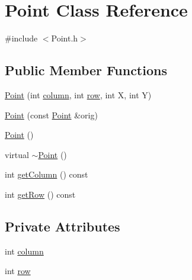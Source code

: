 \hypertarget{classPoint}{
\section{Point Class Reference}
\label{classPoint}
}


{\ttfamily \#include $<$Point.h$>$}\subsection*{Public Member Functions}
\begin{DoxyCompactItemize}
\item 
\hyperlink{classPoint_acd78354f6acd6d1c1bd18c848022ebbc}{Point} (int \hyperlink{classPoint_a08041071ec0b92b604e5f56c0ed47e44}{column}, int \hyperlink{classPoint_a23c0e7e187fad47e1524872d44841908}{row}, int X, int Y)
\item 
\hyperlink{classPoint_a2b6961ba767c68075667c0f3064c6ba9}{Point} (const \hyperlink{classPoint}{Point} \&orig)
\item 
\hyperlink{classPoint_ad92f2337b839a94ce97dcdb439b4325a}{Point} ()
\item 
virtual \hyperlink{classPoint_a395fa04b4ec126b66fc053f829a30cc1}{$\sim$Point} ()
\item 
int \hyperlink{classPoint_af4d25ed7e4898749cea5d2994cafd591}{getColumn} () const 
\item 
int \hyperlink{classPoint_ab2c528e3bee2178c26fdce92786cd8f1}{getRow} () const 
\end{DoxyCompactItemize}
\subsection*{Private Attributes}
\begin{DoxyCompactItemize}
\item 
int \hyperlink{classPoint_a08041071ec0b92b604e5f56c0ed47e44}{column}
\item 
int \hyperlink{classPoint_a23c0e7e187fad47e1524872d44841908}{row}
\end{DoxyCompactItemize}


